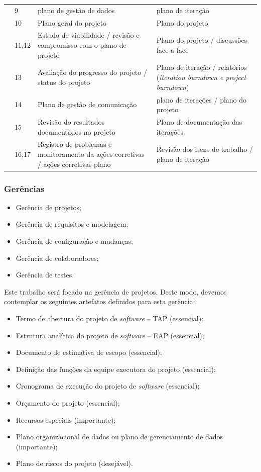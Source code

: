 \documentclass{acm_proc_article-sp}
\begin{document}
\begin{table}[h]
\begin{tabular}{|p{20mm}|p{10mm}|p{60mm}|p{60mm}|}
& 9 & plano de gestão de dados & plano de iteração \\
& 10 & Plano geral do projeto & Plano do projeto \\
& 11,12 & Estudo de viabilidade / revisão e compromisso com o plano de projeto & Plano do projeto / discussões face-a-face \\
& 13 & Avaliação do progresso do projeto / status do projeto & Plano de iteração / relatórios (\textit{iteration burndown
e project burndown})\\
& 14 & Plano de gestão de comunicação & plano de iterações / plano do projeto \\
& 15 & Revisão do resultados documentados no projeto & Plano de documentação das iterações \\
& 16,17 & Registro de problemas e monitoramento da ações corretivas / ações corretivas plano & Revisão dos itens de trabalho / plano de iteração \\

\hline
\end{tabular}
\end{table}

\subsubsection*{Gerências}

\begin{itemize}
\item Gerência de projetos;
\item Gerência de requisitos e modelagem;
\item Gerência de configuração e mudanças;
\item Gerência de colaboradores;
\item Gerência de testes.
\end{itemize}

Este trabalho será focado na gerência de projetos. Deste modo, devemos contemplar os seguintes artefatos definidos para esta gerência:

\begin{itemize}
\item Termo de abertura do  projeto de \textit{software} – TAP (essencial);
\item Estrutura analítica do projeto de \textit{software} – EAP (essencial);
\item Documento de estimativa de escopo (essencial);
\item Definição das funções da equipe executora do projeto (essencial);
\item Cronograma de execução do projeto de \textit{software} (essencial);
\item Orçamento do projeto (essencial);
\item Recursos especiais (importante);
\item Plano organizacional de dados ou plano de gerenciamento de dados  (importante);
\item Plano de riscos do projeto (desejável).
\end{itemize}
\end{document}
